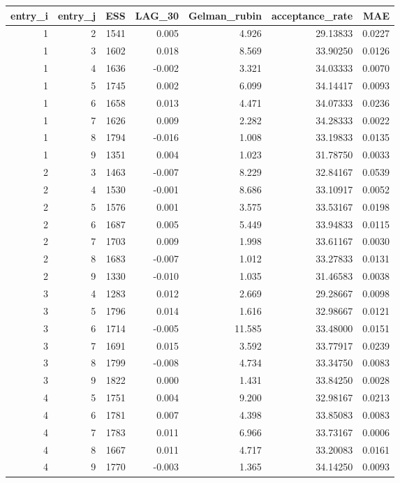 \begin{longtable}{rrrrrrr}
\toprule
entry\_i & entry\_j & ESS & LAG\_30 & Gelman\_rubin & acceptance\_rate & MAE \\ 
\midrule
1 & 2 & 1541 & 0.005 & 4.926 & 29.13833 & 0.0227 \\ 
1 & 3 & 1602 & 0.018 & 8.569 & 33.90250 & 0.0126 \\ 
1 & 4 & 1636 & -0.002 & 3.321 & 34.03333 & 0.0070 \\ 
1 & 5 & 1745 & 0.002 & 6.099 & 34.14417 & 0.0093 \\ 
1 & 6 & 1658 & 0.013 & 4.471 & 34.07333 & 0.0236 \\ 
1 & 7 & 1626 & 0.009 & 2.282 & 34.28333 & 0.0022 \\ 
1 & 8 & 1794 & -0.016 & 1.008 & 33.19833 & 0.0135 \\ 
1 & 9 & 1351 & 0.004 & 1.023 & 31.78750 & 0.0033 \\ 
2 & 3 & 1463 & -0.007 & 8.229 & 32.84167 & 0.0539 \\ 
2 & 4 & 1530 & -0.001 & 8.686 & 33.10917 & 0.0052 \\ 
2 & 5 & 1576 & 0.001 & 3.575 & 33.53167 & 0.0198 \\ 
2 & 6 & 1687 & 0.005 & 5.449 & 33.94833 & 0.0115 \\ 
2 & 7 & 1703 & 0.009 & 1.998 & 33.61167 & 0.0030 \\ 
2 & 8 & 1683 & -0.007 & 1.012 & 33.27833 & 0.0131 \\ 
2 & 9 & 1330 & -0.010 & 1.035 & 31.46583 & 0.0038 \\ 
3 & 4 & 1283 & 0.012 & 2.669 & 29.28667 & 0.0098 \\ 
3 & 5 & 1796 & 0.014 & 1.616 & 32.98667 & 0.0121 \\ 
3 & 6 & 1714 & -0.005 & 11.585 & 33.48000 & 0.0151 \\ 
3 & 7 & 1691 & 0.015 & 3.592 & 33.77917 & 0.0239 \\ 
3 & 8 & 1799 & -0.008 & 4.734 & 33.34750 & 0.0083 \\ 
3 & 9 & 1822 & 0.000 & 1.431 & 33.84250 & 0.0028 \\ 
4 & 5 & 1751 & 0.004 & 9.200 & 32.98167 & 0.0213 \\ 
4 & 6 & 1781 & 0.007 & 4.398 & 33.85083 & 0.0083 \\ 
4 & 7 & 1783 & 0.011 & 6.966 & 33.73167 & 0.0006 \\ 
4 & 8 & 1667 & 0.011 & 4.717 & 33.20083 & 0.0161 \\ 
4 & 9 & 1770 & -0.003 & 1.365 & 34.14250 & 0.0093 \\ 

\end{longtable}

